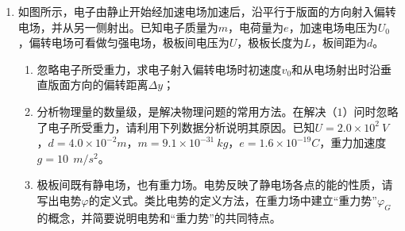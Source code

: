 \begin{enumerate}[leftmargin=0em]
\newpage
\item
{}
如图所示，电子由静止开始经加速电场加速后，沿平行于版面的方向射入偏转电场，并从另一侧射出。已知电子质量为$ m $，电荷量为$ e $，加速电场电压为$ U_{0} $，偏转电场可看做匀强电场，极板间电压为$ U $，极板长度为$ L $，板间距为$ d $。
\begin{enumerate}
\renewcommand{\labelenumi}{\arabic{enumi}.}
\item
忽略电子所受重力，求电子射入偏转电场时初速度$ v_{0} $和从电场射出时沿垂直版面方向的偏转距离$ \Delta y $；
\item 
分析物理量的数量级，是解决物理问题的常用方法。在解决（$ 1 $）问时忽略了电子所受重力，请利用下列数据分析说明其原因。已知$ U=2.0 \times 10^2 \ V $，$ d=4.0 \times 10^{-2}m $，$ m=9.1 \times 10^{-31} \ kg $，$ e=1.6 \times 10^{-19}C $，重力加速度$ g=10 \ \ m/s ^{2} $。
\item 
极板间既有静电场，也有重力场。电势反映了静电场各点的能的性质，请写出电势$ \varphi $的定义式。类比电势的定义方法，在重力场中建立“重力势”$ \varphi _G $的概念，并简要说明电势和“重力势”的共同特点。


\end{enumerate}
\begin{figure}[h!]
\flushright

\end{figure}



\end{enumerate}
